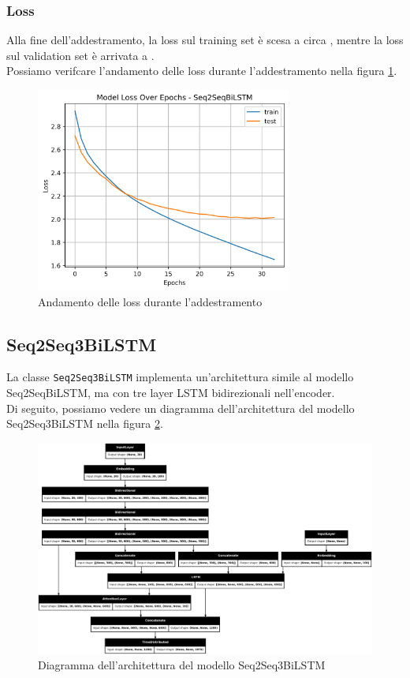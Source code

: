 \documentclass[a4paper, 12pt]{article}
\begin{document}
\subsubsection{Loss}
Alla fine dell'addestramento, la loss sul training set è scesa a circa , mentre la loss sul validation set è arrivata a .\\
Possiamo verifcare l'andamento delle loss durante l'addestramento nella figura \ref{fig:seq2seqbilstm_loss_plot}.
\begin{figure}[H]
    \centering
    \includegraphics[width=0.75\textwidth]{media/Seq2SeqBiLSTM_originale_lossplot.png}
    \caption{Andamento delle loss durante l'addestramento}
    \label{fig:seq2seqbilstm_loss_plot}
\end{figure}

\subsection{Seq2Seq3BiLSTM}
La classe \texttt{Seq2Seq3BiLSTM} implementa un'architettura simile al modello Seq2SeqBiLSTM, ma con tre layer LSTM bidirezionali nell'encoder.\\
Di seguito, possiamo vedere un diagramma dell'architettura del modello Seq2Seq3BiLSTM nella figura \ref{fig:seq2seq3bilstm_model_architecture}.
\begin{figure}[H]
    \centering
    \includegraphics[width=1\textwidth]{media/Seq2Seq3BiLSTM_image.png}
    \caption{Diagramma dell'architettura del modello Seq2Seq3BiLSTM}
    \label{fig:seq2seq3bilstm_model_architecture}
\end{figure}
\end{document}
